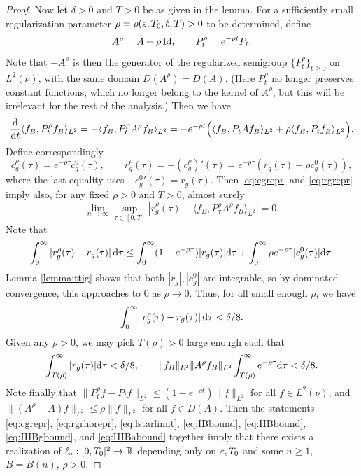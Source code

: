 \begin{proof}
Now let $\delta>0$ and $T>0$ be as given in the lemma. For a sufficiently
small regularization parameter $\rho=\rho(\varepsilon,T_0,\delta,T)>0$ to be
determined, define
\[A^\rho=A+\rho\,\mathrm{Id}, \qquad P_t^\rho=e^{-\rho t}P_t.\]
Note that ${-}A^\rho$ is then the generator of the regularized semigroup
$\{P_t^\rho\}_{t \geq 0}$ on $L^2(\nu)$, with the same domain $D(A^\rho)=D(A)$.
(Here $P_t^\rho$ no longer preserves constant functions, which no longer
belong to the kernel of $A^\rho$, but this will be irrelevant for the rest of
the analysis.) Then we have
\[\frac{\mathrm{d}}{\mathrm{d} t} \langle f_B,P_t^\rho f_B \rangle_{L^2}
={-}\langle f_B,P_t^\rho A^\rho f_B \rangle_{L^2}
={-}e^{-\rho t}\Big(\langle f_B,P_tAf_B \rangle_{L^2}
+\rho \langle f_B,P_tf_B \rangle_{L^2}\Big).\]
Define correspondingly
\[c_g^\rho(\tau)=e^{-\rho \tau}c_g^0(\tau),
\qquad r_g^\rho(\tau)={-}(c_g^\rho)'(\tau)
=e^{-\rho\tau}(r_g(\tau)+\rho c_g^0(\tau)),\]
where the last equality uses ${-}{c_g^0}'(\tau)=r_g(\tau)$.
Then \eqref{eq:cgrepr} and \eqref{eq:rgrepr} imply also, for any fixed
$\rho>0$ and $T>0$, almost surely
\begin{equation}\label{eq:rgrhorepr}
\lim_{n \to \infty} \sup_{\tau \in [0,T]}
|r_g^\rho(\tau)-\langle f_B,P_\tau^\rho A^\rho f_B \rangle_{L^2}|=0.
\end{equation}
Note that
\[\int_0^\infty |r_g^\rho(\tau)-r_g(\tau)|\,\mathrm{d} \tau
\leq \int_0^\infty (1-e^{-\rho \tau})|r_g(\tau)| \mathrm{d} \tau
+\int_0^\infty \rho e^{-\rho \tau}|c_g^0(\tau)| \mathrm{d} \tau.\]
Lemma \ref{lemma:ttig} shows that both $|r_g|,|c_g^0|$ are integrable, so
by dominated convergence, this approaches to 0 as $\rho \to 0$. Thus, for
all small enough $\rho$, we have
\begin{equation}\label{eq:rgrgrho}
\int_0^\infty |r_g^\rho(\tau)-r_g(\tau)|\,\mathrm{d} \tau<\delta/8.
\end{equation}
Given any $\rho>0$, we may pick $T(\rho)>0$ large enough such that
\begin{equation}\label{eq:Trhodef}
\int_{T(\rho)}^\infty |r_g(\tau)|\mathrm{d} \tau
<\delta/8, \qquad
\|f_B\|_{L^2} \|A^\rho f_B\|_{L^2} \int_{T(\rho)}^\infty e^{-\rho\tau}
\mathrm{d} \tau <\delta/8.
\end{equation}
Note finally that
$\|P_t^\rho f-P_t f\|_{L^2} \leq (1-e^{-\rho t})\|f\|_{L^2}$
for all $f \in L^2(\nu)$, and $\|(A^\rho-A)f\|_{L^2} \leq \rho\|f\|_{L^2}$
for all $f \in D(A)$. Then the statements \eqref{eq:cgrepr},
\eqref{eq:rgrhorepr},
\eqref{eq:lstarlimit}, \eqref{eq:IBbound}, \eqref{eq:IIBbound},
\eqref{eq:IIIBgbound}, and \eqref{eq:IIIBabound}
together imply that there exists a realization of $\ell_*:[0,T_0]^2 \to \mathbb{R}$ depending only on $\varepsilon,T_0$ and some $n \geq 1$, $B=B(n)$, $\rho>0$,

\end{proof}
